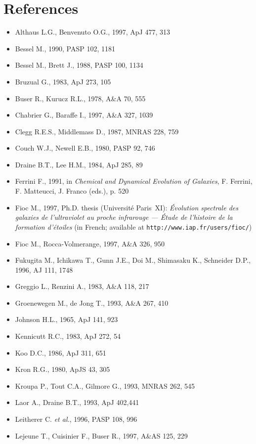\documentclass[11pt,draft,fleqn]{article}
\begin{document}
\section{References}
\begin{itemize}
\itemindent=-0.5cm
\item[] Althaus L.G., Benvenuto O.G., 1997, ApJ 477, 313
\item[] Bessel M., 1990, PASP 102, 1181
\item[] Bessel M., Brett J., 1988, PASP 100, 1134
\item[] Bruzual G., 1983, ApJ 273, 105
\item[] Buser R., Kurucz R.L., 1978, A\&A 70, 555
\item[] Chabrier G., Baraffe I., 1997, A\&A 327, 1039
\item[] Clegg R.E.S., Middlemass D., 1987, MNRAS 228, 759
\item[] Couch W.J., Newell E.B., 1980, PASP 92, 746
\item[] Draine B.T., Lee H.M., 1984, ApJ 285, 89
\item[] Ferrini F., 1991, in \emph{Chemical and Dynamical Evolution of
Galaxies},
F. Ferrini, F. Matteucci, J. Franco (eds.), p. 520
\item[] Fioc M., 1997, Ph.D. thesis (Universit\'e Paris~XI):
\emph{\'Evolution spectrale des galaxies de l'ultraviolet au proche
infrarouge --- \'Etude de l'histoire de la formation d'\'etoiles} (in
French; available at \texttt{http://www.iap.fr/users/fioc/})
\item[] Fioc M., Rocca-$\!$Volmerange, 1997, A\&A 326, 950
\item[] Fukugita M., Ichikawa T.,
 Gunn J.E., Doi M., Shimasaku K.,
 Schneider D.P., 1996, AJ 111, 1748
\item[] Greggio L., Renzini A., 1983, A\&A 118, 217
\item[] Groenewegen M., de Jong T., 1993, A\&A 267, 410
\item[] Johnson H.L., 1965, ApJ 141, 923
\item[] Kennicutt R.C., 1983, ApJ 272, 54
\item[] Koo D.C., 1986, ApJ 311, 651
\item[] Kron R.G., 1980, ApJS 43, 305
\item[] Kroupa P., Tout C.A., Gilmore G., 1993, MNRAS 262, 545
\item[] Laor A., Draine B.T., 1993, ApJ 402,441
\item[] Leitherer C. \emph{et al.}, 1996, PASP 108, 996
\item[] Lejeune T., Cuisinier F., Buser R., 1997, A\&AS 125, 229

\end{itemize}
\end{document}
